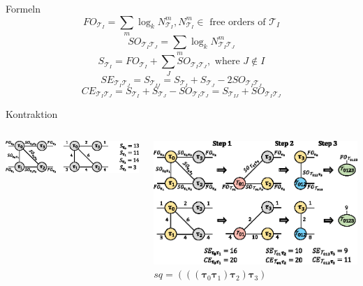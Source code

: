 \documentclass{beamer}
\newcommand{\Tau}{\bm{\mathcal{T}}}
\newcommand{\tauB}{\bm{\tau}}
\begin{document}
\begin{frame}{Formeln}
	\begin{equation}
		FO_{\Tau_I}=\sum\limits_m \log_k N_{\Tau_I}^m, N_{\Tau_I}^m \in \text{ free orders of } \Tau_I
	\end{equation}
	\begin{equation}
		SO_{\Tau_I\Tau_J}=\sum\limits_m \log_k N_{\Tau_I\Tau_J}^m
	\end{equation}
	\begin{equation}
		S_{\Tau_I}=FO_{\Tau_I}+\sum\limits_J SO_{\Tau_I\Tau_J}, \text{ where } J\notin I
	\end{equation}
	\begin{equation}
		SE_{\Tau_I\Tau_J}=S_{\Tau_{IJ}}=S_{\Tau_I}+S_{\Tau_J}-2SO_{\Tau_I\Tau_J}
	\end{equation}
	\begin{equation}
		CE_{\Tau_I\Tau_J}=S_{\Tau_I}+S_{\Tau_J}-SO_{\Tau_I\Tau_J}=S_{\Tau_{IJ}}+SO_{\Tau_I\Tau_J}
	\end{equation}
\end{frame}

\begin{frame}{Kontraktion}
	\begin{columns}
		\begin{column}{0.4\textwidth}
			\includegraphics[scale=.65]{figure_03_a}
		\end{column}
		\begin{column}{0.6\textwidth}
			\includegraphics[scale=.7]{figure_03_b}
			$sq=(((\tauB_0\tauB_1)\tauB_2)\tauB_3)$
		\end{column}
	\end{columns}
\end{frame}
\end{document}
